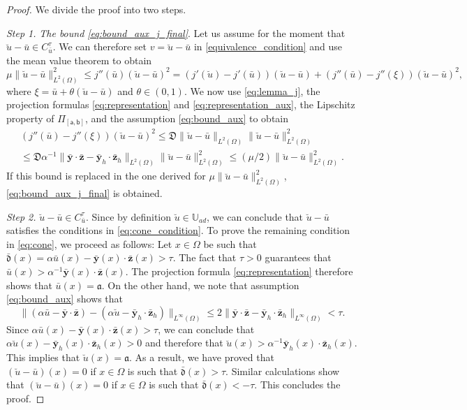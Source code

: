 \documentclass[final]{siamart0216}
\begin{document}
\begin{proof} We divide the proof into two steps.

\emph{Step 1.} \emph{The bound \eqref{eq:bound_aux_j_final}}. Let us assume for the moment that $\breve{u}-\bar{u} \in C_{\bar u}^{\tau}$. We can therefore set $v = \breve{u}-\bar{u}$ in \eqref{equivalence_condition} and use the mean value theorem to obtain
\[
\mu \| \breve{u}-\bar{u} \|_{L^2(\Omega)}^2 \leq j''(\bar{u})(\breve{u}-\bar{u})^2 = (j'(\breve{u})-j'(\bar{u}))(\breve{u}-\bar{u})+(j''(\bar{u})-j''(\xi))(\breve{u}-\bar{u})^2,
\]
where $\xi=\bar{u}+\theta (\breve{u}-\bar{u})$ and $\theta \in (0,1)$. We now use \eqref{eq:lemma_j}, the projection formulas \eqref{eq:representation} and \eqref{eq:representation_aux}, the Lipschitz property of $\Pi_{[\mathsf{a},\mathsf{b}]}$, and the assumption \eqref{eq:bound_aux} to obtain
\begin{multline}
 (j''(\bar{u})-j''(\xi))(\breve{u}-\bar{u})^2 \leq \mathfrak{D} \| \breve{u} -\bar{u} \|_{L^2(\Omega)} \|\breve{u}-\bar{u}\|_{L^2(\Omega)}^2
 \\
 \leq \mathfrak{D} \alpha^{-1} \|\bar{\mathbf{y}}\cdot \bar{\mathbf{z}} - \bar{\mathbf{y}}_h\cdot \bar{\mathbf{z}}_h  \|_{L^2(\Omega)} \|\breve{u}-\bar{u}\|_{L^2(\Omega)}^2 \leq (\mu/2) \|\breve{u}-\bar{u}\|_{L^2(\Omega)}^2.
\end{multline}
If this bound is replaced in the one derived for $\mu \| \breve{u}-\bar{u} \|_{L^2(\Omega)}^2$, \eqref{eq:bound_aux_j_final} is obtained.

\emph{Step 2.} $\breve{u}-\bar{u} \in C_{\bar u}^{\tau}$. Since by definition $\breve{u} \in \mathbb{U}_{ad}$, we can conclude that $\breve{u}-\bar{u}$ satisfies the conditions in \eqref{eq:cone_condition}. To prove the remaining condition in \eqref{eq:cone}, we proceed as follows: Let $x\in \Omega$ be such that $\bar{\mathfrak{d}}(x) = \alpha \bar{u}(x) - \bar{\mathbf{y}}(x) \cdot \bar{\mathbf{z}}(x) > \tau$. The fact that $\tau > 0$ guarantees that $\bar{u}(x) > \alpha^{-1} \bar{\mathbf{y}}(x) \cdot \bar{\mathbf{z}}(x)$. The projection formula \eqref{eq:representation} therefore shows that $\bar{u}(x) = \mathfrak{a}$. On the other hand, we note that assumption \eqref{eq:bound_aux} shows that 
\[
 \| (\alpha \bar{u} - \bar{\mathbf{y}} \cdot \bar{\mathbf{z}}) - ( \alpha \breve{u}- \bar{\mathbf{y}}_h \cdot \bar{\mathbf{z}}_h )  \|_{L^{\infty}(\Omega)} 
 \leq 2 \| \bar{\mathbf{y}} \cdot \bar{\mathbf{z}} -  \bar{\mathbf{y}}_h \cdot \bar{\mathbf{z}}_h  \|_{L^{\infty}(\Omega)} < \tau.
\]
Since $\alpha \bar{u}(x) - \bar{\mathbf{y}}(x) \cdot \bar{\mathbf{z}}(x) > \tau$, we can conclude that $\alpha \breve{u}(x)- \bar{\mathbf{y}}_h(x) \cdot \bar{\mathbf{z}}_h(x) >0$ and therefore that $\breve{u}(x) > \alpha^{-1} \bar{\mathbf{y}}_h(x) \cdot \bar{\mathbf{z}}_h(x)$. This implies that $\breve{u}(x) = \mathfrak{a}$. As a result, we have proved that $(\breve{u} - \bar{u})(x) = 0$ if $x \in \Omega$ is such that $\bar{\mathfrak{d}}(x) > \tau$. Similar calculations show that $(\breve{u} - \bar{u})(x) = 0$ if $x \in \Omega$ is such that $\bar{\mathfrak{d}}(x) < -\tau$. This concludes the proof.
\end{proof}
\end{document}
